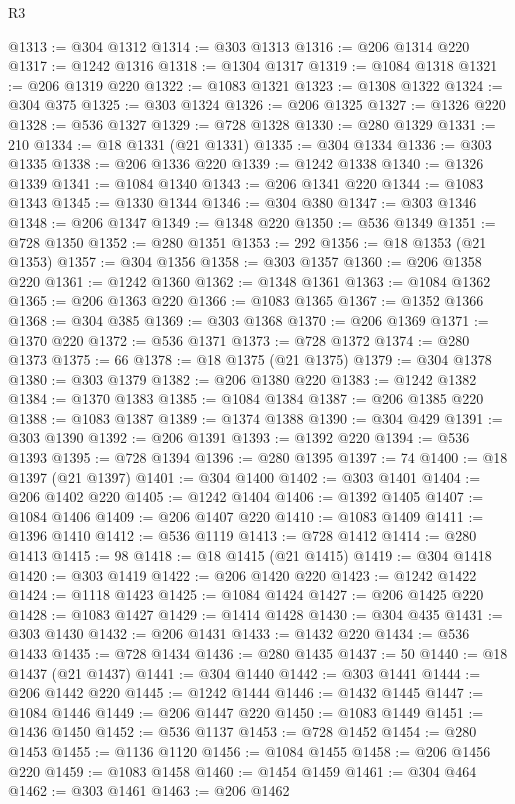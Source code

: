 \begin{lexlean}{R3}
\begin{coremodule}
@1313 := @304 @1312
@1314 := @303 @1313
@1316 := @206 @1314 @220
@1317 := @1242 @1316
@1318 := @1304 @1317
@1319 := @1084 @1318
@1321 := @206 @1319 @220
@1322 := @1083 @1321
@1323 := @1308 @1322
@1324 := @304 @375
@1325 := @303 @1324
@1326 := @206 @1325
@1327 := @1326 @220
@1328 := @536 @1327
@1329 := @728 @1328
@1330 := @280 @1329
@1331 := 210
@1334 := @18 @1331 (@21 @1331)
@1335 := @304 @1334
@1336 := @303 @1335
@1338 := @206 @1336 @220
@1339 := @1242 @1338
@1340 := @1326 @1339
@1341 := @1084 @1340
@1343 := @206 @1341 @220
@1344 := @1083 @1343
@1345 := @1330 @1344
@1346 := @304 @380
@1347 := @303 @1346
@1348 := @206 @1347
@1349 := @1348 @220
@1350 := @536 @1349
@1351 := @728 @1350
@1352 := @280 @1351
@1353 := 292
@1356 := @18 @1353 (@21 @1353)
@1357 := @304 @1356
@1358 := @303 @1357
@1360 := @206 @1358 @220
@1361 := @1242 @1360
@1362 := @1348 @1361
@1363 := @1084 @1362
@1365 := @206 @1363 @220
@1366 := @1083 @1365
@1367 := @1352 @1366
@1368 := @304 @385
@1369 := @303 @1368
@1370 := @206 @1369
@1371 := @1370 @220
@1372 := @536 @1371
@1373 := @728 @1372
@1374 := @280 @1373
@1375 := 66
@1378 := @18 @1375 (@21 @1375)
@1379 := @304 @1378
@1380 := @303 @1379
@1382 := @206 @1380 @220
@1383 := @1242 @1382
@1384 := @1370 @1383
@1385 := @1084 @1384
@1387 := @206 @1385 @220
@1388 := @1083 @1387
@1389 := @1374 @1388
@1390 := @304 @429
@1391 := @303 @1390
@1392 := @206 @1391
@1393 := @1392 @220
@1394 := @536 @1393
@1395 := @728 @1394
@1396 := @280 @1395
@1397 := 74
@1400 := @18 @1397 (@21 @1397)
@1401 := @304 @1400
@1402 := @303 @1401
@1404 := @206 @1402 @220
@1405 := @1242 @1404
@1406 := @1392 @1405
@1407 := @1084 @1406
@1409 := @206 @1407 @220
@1410 := @1083 @1409
@1411 := @1396 @1410
@1412 := @536 @1119
@1413 := @728 @1412
@1414 := @280 @1413
@1415 := 98
@1418 := @18 @1415 (@21 @1415)
@1419 := @304 @1418
@1420 := @303 @1419
@1422 := @206 @1420 @220
@1423 := @1242 @1422
@1424 := @1118 @1423
@1425 := @1084 @1424
@1427 := @206 @1425 @220
@1428 := @1083 @1427
@1429 := @1414 @1428
@1430 := @304 @435
@1431 := @303 @1430
@1432 := @206 @1431
@1433 := @1432 @220
@1434 := @536 @1433
@1435 := @728 @1434
@1436 := @280 @1435
@1437 := 50
@1440 := @18 @1437 (@21 @1437)
@1441 := @304 @1440
@1442 := @303 @1441
@1444 := @206 @1442 @220
@1445 := @1242 @1444
@1446 := @1432 @1445
@1447 := @1084 @1446
@1449 := @206 @1447 @220
@1450 := @1083 @1449
@1451 := @1436 @1450
@1452 := @536 @1137
@1453 := @728 @1452
@1454 := @280 @1453
@1455 := @1136 @1120
@1456 := @1084 @1455
@1458 := @206 @1456 @220
@1459 := @1083 @1458
@1460 := @1454 @1459
@1461 := @304 @464
@1462 := @303 @1461
@1463 := @206 @1462

\end{coremodule}
\end{lexlean}
